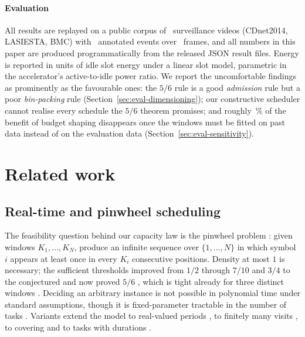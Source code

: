 \documentclass[final,5p,times,twocolumn]{elsarticle}
\theoremstyle{definition}
\newcommand{\Nc}{N}
\newcommand{\Ki}{K_i}
\begin{document}
\paragraph{Evaluation}
All results are replayed on a public corpus of \numVideos\ surveillance videos
(CDnet2014, LASIESTA, BMC) with \numEvents\ annotated events over \numFrames\ frames, and all
numbers in this paper are produced programmatically from the released JSON result files. Energy
is reported in units of idle slot energy under a linear slot model, parametric in the
accelerator's active-to-idle power ratio. We report the uncomfortable findings as prominently
as the favourable ones: the
$5/6$ rule is a good \emph{admission} rule but a poor \emph{bin-packing} rule
(Section~\ref{sec:eval-dimensioning}); our constructive scheduler cannot realise every schedule
the $5/6$ theorem promises; and roughly \numOracleShare\,\% of the benefit of budget shaping
disappears once the windows must be fitted on past data instead of on the evaluation data
(Section~\ref{sec:eval-sensitivity}).

\section{Related work}\label{sec:related}

\subsection{Real-time and pinwheel scheduling}
The feasibility question behind our capacity law is the pinwheel problem
\cite{holte1989pinwheel}: given windows $K_1,\dots,K_\Nc$, produce an infinite sequence over
$\{1,\dots,\Nc\}$ in which symbol $i$ appears at least once in every $\Ki$ consecutive positions.
Density at most $1$ is necessary; the sufficient thresholds improved from $1/2$
\cite{holte1989pinwheel} through $7/10$ \cite{chanchin1993schedulers,chanchin1992general} and
$3/4$ \cite{fishburn2002densities} to the conjectured and now proved $5/6$
\cite{kawamura2024stoc,kawamura2026pnas}, which is tight already for three distinct windows
\cite{linlin1997three}. Deciding an arbitrary instance is not possible in polynomial time under
standard assumptions, though it is fixed-parameter tractable in the number of tasks
\cite{kobayashi2026tcs}. Variants extend the model to real-valued periods
\cite{fujiwara2026real}, to finitely many visits \cite{kanellopoulos2025kvisits}, to covering
\cite{kawamura2025covering} and to tasks with durations \cite{kusano2026sofsem}.
\end{document}
